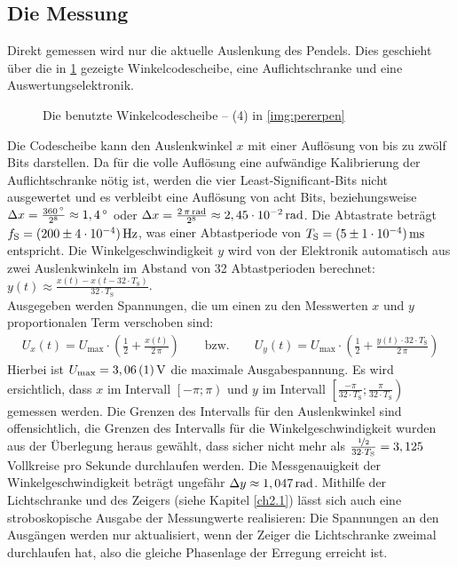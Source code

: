 \documentclass[numbers=noenddot,12pt,a4paper]{scrartcl}
\newcommand{\degree}{^\circ}
\newcommand{\tenpo}[1]{\cdot 10^{#1}}
\newcommand{\ix}[1]{_\text{#1}}
\begin{document}
\subsection{Die Messung}\label{ch2.2}
Direkt gemessen wird nur die aktuelle Auslenkung des Pendels. Dies geschieht über die in \ref{img:wicosch} gezeigte Winkelcodescheibe, eine Auflichtschranke und eine Auswertungselektronik.
\begin{figure}[H]
	\centering
	\caption{Die benutzte Winkelcodescheibe -- (4) in \ref{img:pererpen}}
	\label{img:wicosch}
\end{figure}
Die Codescheibe kann den Auslenkwinkel $x$ mit einer Auflösung von bis zu zwölf Bits darstellen. Da für die volle Auflösung eine aufwändige Kalibrierung der Auflichtschranke nötig ist, werden die vier Least-Significant-Bits nicht ausgewertet und es verbleibt eine Auflösung von acht Bits, beziehungsweise $\Delta x=\frac{\unit[360]{\degree}}{2^8}\approx\unit[1,4]{\degree}$ oder $\Delta x=\frac{\unit[2\,\pi]{rad}}{2^8}\approx\unit[2,45\tenpo{-2}]{rad}$. Die Abtastrate beträgt $f\ix{S}=\unit[(200\pm4\tenpo{-4})]{Hz}$, was einer Abtastperiode von $T\ix{S}=\unit[(5\pm1\tenpo{-4})]{ms}$ entspricht. Die Winkelgeschwindigkeit $y$ wird von der Elektronik automatisch aus zwei Auslenkwinkeln im Abstand von 32 Abtastperioden berechnet: $y(t)\approx\frac{x(t)-x(t-32\cdot T\ix{S})}{32\cdot T\ix{S}}$.\\
Ausgegeben werden Spannungen, die um einen zu den Messwerten $x$ und $y$ proportionalen Term verschoben sind:
\begin{align}
U_x(t)=U\ix{max}\cdot\left(\frac{1}{2}+\frac{x(t)}{2\,\pi}\right)\hspace{2em}\text{bzw.}\hspace{2em}U_y(t)=U\ix{max}\cdot\left(\frac{1}{2}+\frac{y(t)\cdot 32\cdot T\ix{S}}{2\,\pi}\right)
\end{align}
Hierbei ist $U\ix{max}=\unit[3,06\,(1)]{V}$ die maximale Ausgabespannung. Es wird ersichtlich, dass $x$ im Intervall $\left[-\pi;\pi\right)$ und $y$ im Intervall $\left[\frac{-\pi}{32\cdot T\ix{S}};\frac{\pi}{32\cdot T\ix{S}}\right)$ gemessen werden. Die Grenzen des Intervalls für den Auslenkwinkel sind offensichtlich, die Grenzen des Intervalls für die Winkelgeschwindigkeit wurden aus der Überlegung heraus gewählt, dass sicher nicht mehr als $\frac{\nicefrac{1}{2}}{32\cdot T\ix{S}}=3,125$ Vollkreise pro Sekunde durchlaufen werden. Die Messgenauigkeit der Winkelgeschwindigkeit beträgt ungefähr $\Delta y\approx\unit[1,047]{rad}$. Mithilfe der Lichtschranke und des Zeigers (siehe Kapitel \ref{ch2.1}) lässt sich auch eine stroboskopische Ausgabe der Messungwerte realisieren: Die Spannungen an den Ausgängen werden nur aktualisiert, wenn der Zeiger die Lichtschranke zweimal durchlaufen hat, also die gleiche Phasenlage der Erregung erreicht ist.
\end{document}
